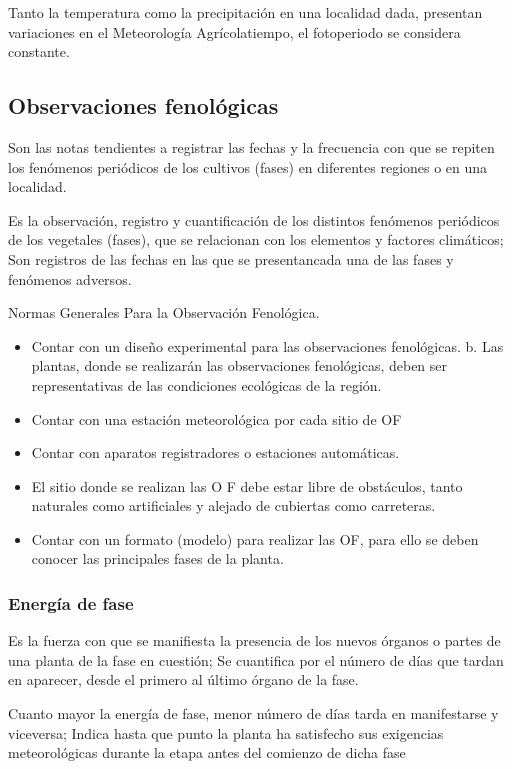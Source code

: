 Tanto la temperatura como la precipitación en una localidad dada, presentan variaciones en el Meteorología Agrícolatiempo, el fotoperiodo se considera constante.

\subsection{Observaciones fenológicas}

Son las notas tendientes a registrar las fechas y la frecuencia con que se repiten los fenómenos periódicos de los cultivos (fases) en diferentes regiones o en una localidad.

Es la observación, registro y cuantificación de los distintos fenómenos periódicos de los vegetales (fases), que se relacionan con los elementos y factores climáticos; Son registros de las fechas en las que se presentancada una de las fases y fenómenos adversos.

Normas Generales Para la Observación Fenológica.
\begin{itemize}
    \item Contar con un diseño experimental para las observaciones fenológicas. b. Las plantas, donde se realizarán las observaciones fenológicas, deben ser representativas de las condiciones ecológicas de la región.
    \item Contar con una estación meteorológica por cada sitio de OF
    \item Contar con aparatos registradores o estaciones automáticas.
    \item El sitio donde se realizan las O F debe estar libre de obstáculos, tanto naturales como artificiales y alejado de cubiertas como carreteras.
    \item Contar con un formato (modelo) para realizar las OF, para ello se deben conocer las principales fases de la planta.
\end{itemize}
\subsubsection{Energía de fase}

Es la fuerza con que se manifiesta la presencia de los nuevos órganos o partes de una planta de la fase en cuestión; Se cuantifica por el número de días que tardan en aparecer, desde el primero al último órgano de la fase.

Cuanto mayor la energía de fase, menor número de días tarda en manifestarse y viceversa; Indica hasta que punto la planta ha satisfecho sus exigencias meteorológicas durante la etapa antes del comienzo de dicha fase


